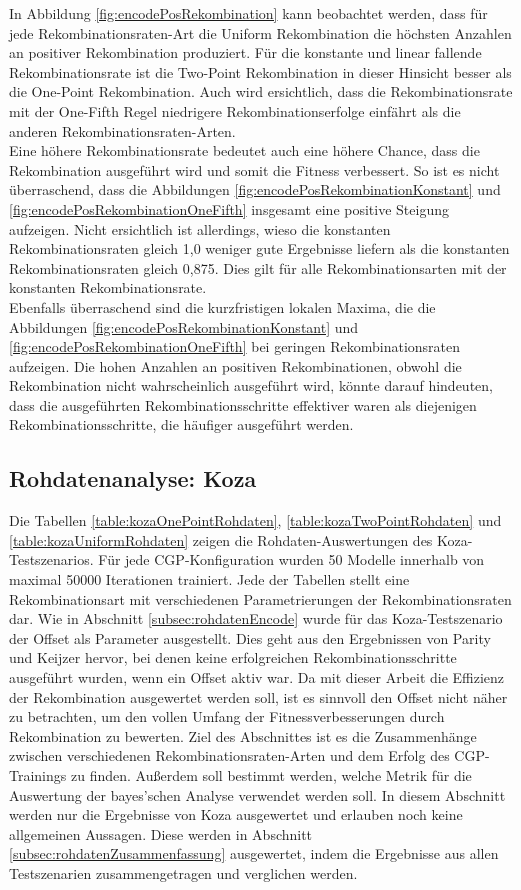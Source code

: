 In Abbildung \ref{fig:encodePosRekombination} kann beobachtet werden, dass für jede Rekombinationsraten-Art die Uniform Rekombination die höchsten Anzahlen an positiver Rekombination produziert.
Für die konstante und linear fallende Rekombinationsrate ist die Two-Point Rekombination in dieser Hinsicht besser als die One-Point Rekombination.
Auch wird ersichtlich, dass die Rekombinationsrate mit der One-Fifth Regel niedrigere Rekombinationserfolge einfährt als die anderen Rekombinationsraten-Arten.\\
Eine höhere Rekombinationsrate bedeutet auch eine höhere Chance, dass die Rekombination ausgeführt wird und somit die Fitness verbessert.
So ist es nicht überraschend, dass die Abbildungen \ref{fig:encodePosRekombinationKonstant} und \ref{fig:encodePosRekombinationOneFifth} insgesamt eine positive Steigung aufzeigen.
Nicht ersichtlich ist allerdings, wieso die konstanten Rekombinationsraten gleich 1,0 weniger gute Ergebnisse liefern als die konstanten Rekombinationsraten gleich 0,875.
Dies gilt für alle Rekombinationsarten mit der konstanten Rekombinationsrate.\\
Ebenfalls überraschend sind die kurzfristigen lokalen Maxima, die die Abbildungen \ref{fig:encodePosRekombinationKonstant} und \ref{fig:encodePosRekombinationOneFifth} bei geringen Rekombinationsraten aufzeigen.
Die hohen Anzahlen an positiven Rekombinationen, obwohl die Rekombination nicht wahrscheinlich ausgeführt wird, könnte darauf hindeuten, dass die ausgeführten Rekombinationsschritte effektiver waren als diejenigen Rekombinationsschritte, die häufiger ausgeführt werden.


\subsection{Rohdatenanalyse: Koza}
\label{subsec:rohdatenKoza}

Die Tabellen \ref{table:kozaOnePointRohdaten}, \ref{table:kozaTwoPointRohdaten} und \ref{table:kozaUniformRohdaten} zeigen die Rohdaten-Auswertungen des Koza-Testszenarios.
Für jede CGP-Konfiguration wurden 50 Modelle innerhalb von maximal 50000 Iterationen trainiert.
Jede der Tabellen stellt eine Rekombinationsart mit verschiedenen Parametrierungen der Rekombinationsraten dar.
Wie in Abschnitt \ref{subsec:rohdatenEncode} wurde für das Koza-Testszenario der Offset als Parameter ausgestellt.
Dies geht aus den Ergebnissen von Parity und Keijzer hervor, bei denen keine erfolgreichen Rekombinationsschritte ausgeführt wurden, wenn ein Offset aktiv war.
Da mit dieser Arbeit die Effizienz der Rekombination ausgewertet werden soll, ist es sinnvoll den Offset nicht näher zu betrachten, um den vollen Umfang der Fitnessverbesserungen durch Rekombination zu bewerten.
Ziel des Abschnittes ist es die Zusammenhänge zwischen verschiedenen Rekombinationsraten-Arten und dem Erfolg des CGP-Trainings zu finden.
Außerdem soll bestimmt werden, welche Metrik für die Auswertung der bayes'schen Analyse verwendet werden soll.
In diesem Abschnitt werden nur die Ergebnisse von Koza ausgewertet und erlauben noch keine allgemeinen Aussagen.
Diese werden in Abschnitt \ref{subsec:rohdatenZusammenfassung} ausgewertet, indem die Ergebnisse aus allen Testszenarien zusammengetragen und verglichen werden.

